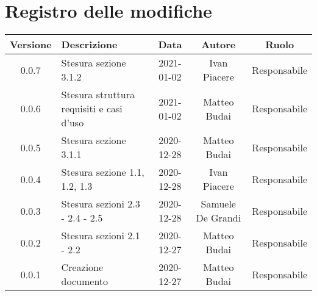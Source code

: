 \section*{Registro delle modifiche}

\begin{center}
	\begin{longtable}{|c|p{5cm}|c|c|c|}
		\hline
		\rowcolor{lighter-grayer}
		\textbf{Versione} & \textbf{Descrizione} & \textbf{Data} & \textbf{Autore} & \textbf{Ruolo} \\
		\hline
		\endfirsthead
		
		0.0.7 & Stesura sezione 3.1.2 & 2021-01-02 & Ivan Piacere & Responsabile\\
		\hline
		0.0.6 & Stesura struttura requisiti e casi d'uso & 2021-01-02 & Matteo Budai & Responsabile \\
		\hline
		0.0.5 & Stesura sezione 3.1.1 & 2020-12-28 & Matteo Budai & Responsabile \\
		\hline
		0.0.4 & Stesura sezione 1.1, 1.2, 1.3 & 2020-12-28 & Ivan Piacere & Responsabile \\
		\hline
		0.0.3 & Stesura sezioni 2.3 - 2.4 - 2.5 & 2020-12-28 & Samuele De Grandi & Responsabile \\
		\hline
		0.0.2 & Stesura sezioni 2.1 - 2.2 & 2020-12-27 & Matteo Budai & Responsabile \\
		\hline
		0.0.1 & Creazione documento & 2020-12-27 & Matteo Budai & Responsabile \\
		\hline
		
	\end{longtable}
\end{center}